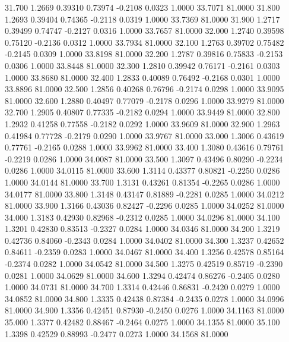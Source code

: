   31.700   1.2669   0.39310   0.73974  -0.2108   0.0323   1.0000  33.7071  81.0000
  31.800   1.2693   0.39404   0.74365  -0.2118   0.0319   1.0000  33.7369  81.0000
  31.900   1.2717   0.39499   0.74747  -0.2127   0.0316   1.0000  33.7657  81.0000
  32.000   1.2740   0.39598   0.75120  -0.2136   0.0312   1.0000  33.7934  81.0000
  32.100   1.2763   0.39702   0.75482  -0.2145   0.0309   1.0000  33.8198  81.0000
  32.200   1.2787   0.39816   0.75833  -0.2153   0.0306   1.0000  33.8448  81.0000
  32.300   1.2810   0.39942   0.76171  -0.2161   0.0303   1.0000  33.8680  81.0000
  32.400   1.2833   0.40089   0.76492  -0.2168   0.0301   1.0000  33.8896  81.0000
  32.500   1.2856   0.40268   0.76796  -0.2174   0.0298   1.0000  33.9095  81.0000
  32.600   1.2880   0.40497   0.77079  -0.2178   0.0296   1.0000  33.9279  81.0000
  32.700   1.2905   0.40807   0.77335  -0.2182   0.0294   1.0000  33.9449  81.0000
  32.800   1.2932   0.41258   0.77558  -0.2182   0.0292   1.0000  33.9609  81.0000
  32.900   1.2963   0.41984   0.77728  -0.2179   0.0290   1.0000  33.9767  81.0000
  33.000   1.3006   0.43619   0.77761  -0.2165   0.0288   1.0000  33.9962  81.0000
  33.400   1.3080   0.43616   0.79761  -0.2219   0.0286   1.0000  34.0087  81.0000
  33.500   1.3097   0.43496   0.80290  -0.2234   0.0286   1.0000  34.0115  81.0000
  33.600   1.3114   0.43377   0.80821  -0.2250   0.0286   1.0000  34.0144  81.0000
  33.700   1.3131   0.43261   0.81354  -0.2265   0.0286   1.0000  34.0177  81.0000
  33.800   1.3148   0.43147   0.81889  -0.2281   0.0285   1.0000  34.0212  81.0000
  33.900   1.3166   0.43036   0.82427  -0.2296   0.0285   1.0000  34.0252  81.0000
  34.000   1.3183   0.42930   0.82968  -0.2312   0.0285   1.0000  34.0296  81.0000
  34.100   1.3201   0.42830   0.83513  -0.2327   0.0284   1.0000  34.0346  81.0000
  34.200   1.3219   0.42736   0.84060  -0.2343   0.0284   1.0000  34.0402  81.0000
  34.300   1.3237   0.42652   0.84611  -0.2359   0.0283   1.0000  34.0467  81.0000
  34.400   1.3256   0.42578   0.85164  -0.2374   0.0282   1.0000  34.0542  81.0000
  34.500   1.3275   0.42519   0.85719  -0.2390   0.0281   1.0000  34.0629  81.0000
  34.600   1.3294   0.42474   0.86276  -0.2405   0.0280   1.0000  34.0731  81.0000
  34.700   1.3314   0.42446   0.86831  -0.2420   0.0279   1.0000  34.0852  81.0000
  34.800   1.3335   0.42438   0.87384  -0.2435   0.0278   1.0000  34.0996  81.0000
  34.900   1.3356   0.42451   0.87930  -0.2450   0.0276   1.0000  34.1163  81.0000
  35.000   1.3377   0.42482   0.88467  -0.2464   0.0275   1.0000  34.1355  81.0000
  35.100   1.3398   0.42529   0.88993  -0.2477   0.0273   1.0000  34.1568  81.0000

